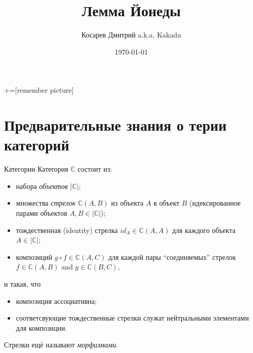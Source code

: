 \documentclass[
  russian,
  aspectratio=169,
  xcolor={svgnames},
  hyperref={colorlinks,citecolor=DeepPink4}]{beamer}
\title{Лемма Йонеды}
\author[Косарев Дмитрий]{Косарев Дмитрий a.k.a. Kakadu}
\institute[]{матмех СПбГУ}
\date{\today}
\begin{document}
\maketitle

+=[remember picture]

\everymath{\displaystyle}


\section{Предварительные знания о терии категорий}

\begin{frame}[fragile]{Категории}
 Категория $\mathbb{C}$ состоит из:
\begin{itemize}
 \item набора \textit{объектов} |$\mathbb{C}$|;
 \item множества \textit{стрелок} $\mathbb{C}(A, B)$ из объекта $A$ в объект $B$ (идексированное парами объектов $A, B \in |\mathbb{C}|$);
 \item тождественная (identity) стрелка $id_A \in\mathbb{C}(A, A)$ для каждого объекта $A \in |\mathbb{C}|$;
 \item композиций $g\circ f \in\mathbb{C}(A, C)$ для каждой пары ``соединяемых'' стрелок $f \in\mathbb{C}(A, B)$ and $g \in\mathbb{C}(B, C)$,\\
\end{itemize}
и такая, что
\begin{itemize}
 \item композиция ассоциативна;
 \item соответсвующие тождественные стрелки служат нейтральными элементами для композиции.
\end{itemize}
\vspace{0.5cm}
Стрелки ещё называют \textit{морфизмами}.
\end{frame}
\end{document}

